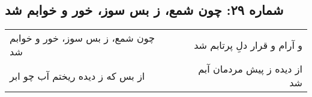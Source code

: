 \begin{center}
\section*{شماره ۲۹: چون شمع، ز بس سوز، خور و خوابم شد}
\label{sec:029}
\begin{longtable}{l p{0.5cm} r}
چون شمع، ز بس سوز، خور و خوابم شد
&&
و آرام و قرار دلِ پرتابم شد
\\
از بس که ز دیده ریختم آب چو ابر
&&
از دیده ز پیش مردمان آبم شد
\\
\end{longtable}
\end{center}
